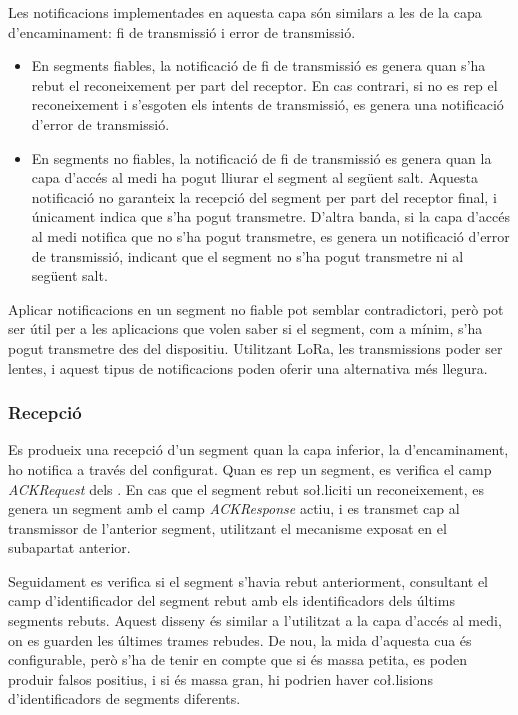 \documentclass{tfgitic}[2024/07/01]
\begin{document}
{Les notificacions implementades en aquesta capa són similars a les de la capa d'encaminament: fi de transmissió i error de transmissió.
\begin{itemize}
    \item En segments fiables, la notificació de fi de transmissió es genera quan s'ha rebut el reconeixement per part del receptor. En cas contrari, si no es rep el reconeixement i s'esgoten els intents de transmissió, es genera una notificació d'error de transmissió.
    \item En segments no fiables, la notificació de fi de transmissió es genera quan la capa d'accés al medi ha pogut lliurar el segment al següent salt. Aquesta notificació no garanteix la recepció del segment per part del receptor final, i únicament indica que s'ha pogut transmetre. D'altra banda, si la capa d'accés al medi notifica que no s'ha pogut transmetre, es genera un notificació d'error de transmissió, indicant que el segment no s'ha pogut transmetre ni al següent salt.
\end{itemize}
Aplicar notificacions en un segment no fiable pot semblar contradictori, però pot ser útil per a les aplicacions que volen saber si el segment, com a mínim, s'ha pogut transmetre des del dispositiu. Utilitzant LoRa, les transmissions poder ser lentes, i aquest tipus de notificacions poden oferir una alternativa més llegura.

\subsubsection{Recepció}
Es produeix una recepció d'un segment quan la capa inferior, la d'encaminament, ho notifica a través del  configurat. Quan es rep un segment, es verifica el camp \emph{ACKRequest} dels . En cas que el segment rebut so\l.liciti un reconeixement, es genera un segment amb el camp \emph{ACKResponse} actiu, i es transmet cap al transmissor de l'anterior segment, utilitzant el mecanisme exposat en el subapartat anterior.

Seguidament es verifica si el segment s'havia rebut anteriorment, consultant el camp d'identificador del segment rebut amb els identificadors dels últims segments rebuts. Aquest disseny és similar a l'utilitzat a la capa d'accés al medi, on es guarden les últimes trames rebudes. De nou, la mida d'aquesta cua és configurable, però s'ha de tenir en compte que si és massa petita, es poden produir falsos positius, i si és massa gran, hi podrien haver co\l.lisions d'identificadors de segments diferents.

}
\end{document}
